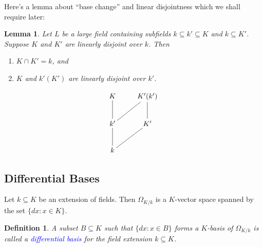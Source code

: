 \documentclass[10pt]{article}
\theoremstyle{thmstyle}
\newtheorem{lemma}[theorem]{Lemma}
\theoremstyle{defstyle}
\newtheorem{definition}[theorem]{Definition}
\newcommand{\define}[1]{\textcolor{blue}{\textit{#1}}}
\begin{document}
Here's a lemma about ``base change'' and linear disjointness which we shall require later: 
\begin{lemma}
    Let $L$ be a large field containing subfields $k\subseteq k'\subseteq K$ and $k\subseteq K'$. Suppose $K$ and $K'$ are linearly disjoint over $k$. Then 
    \begin{enumerate}[label=(\arabic*)]
        \item $K\cap K' = k$, and 
        \item $K$ and $k'(K')$ are linearly disjoint over $k'$.
    \end{enumerate}
    \begin{equation*}
        \xymatrix {
            K & K'(k')\\
            k'\ar@{-}[u]\ar@{-}[ru] & K'\ar@{-}[u]\\
            k\ar@{-}[u]\ar@{-}[ru]
        }
    \end{equation*}
\end{lemma}

\subsection{Differential Bases}

Let $k\subseteq K$ be an extension of fields. Then $\Omega_{K/k}$ is a $K$-vector space spanned by the set $\{dx\colon x\in K\}$.

\begin{definition}
    A subset $B\subseteq K$ such that $\{dx\colon x\in B\}$ forms a $K$-basis of $\Omega_{K/k}$ is called a \define{differential basis} for the field extension $k\subseteq K$.
\end{definition}
\end{document}
